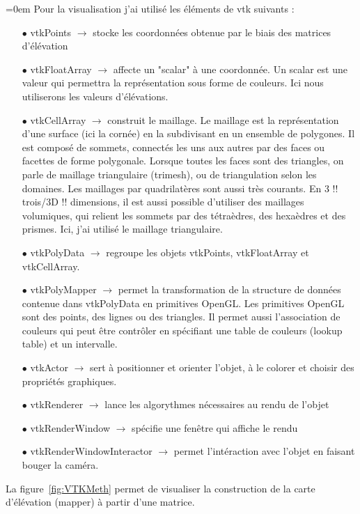 \documentclass[a4paper,12pt]{article}
\begin{document}
\vspace{0.25cm}
\parindent=0em Pour la visualisation j'ai utilisé les éléments de vtk suivants :
\begin{itemize}\setlength{\itemsep}{1mm}
	\item[$\bullet$] vtkPoints	$\rightarrow$ stocke les coordonnées obtenue par le biais des matrices d'élévation 
	\item[$\bullet$] vtkFloatArray $\rightarrow$ affecte un "scalar" à une coordonnée. Un scalar est une valeur qui permettra la représentation sous forme de couleurs. Ici nous utiliserons les valeurs d'élévations.
	\item[$\bullet$] vtkCellArray $\rightarrow$ construit le maillage. Le maillage est la représentation d'une surface (ici la cornée) en la subdivisant en un ensemble de polygones. Il est composé de sommets,  connectés les uns aux autres par des faces ou facettes de forme polygonale. Lorsque toutes les faces sont des triangles, on parle de maillage triangulaire (trimesh), ou de triangulation selon les domaines. Les maillages par quadrilatères sont aussi très courants. En 3 !! trois/3D !! dimensions, il est aussi possible d'utiliser des maillages volumiques, qui relient les sommets par des tétraèdres, des hexaèdres et des prismes. Ici, j'ai utilisé le maillage triangulaire. 
	\item[$\bullet$] vtkPolyData $\rightarrow$ regroupe les objets vtkPoints, vtkFloatArray et vtkCellArray.
	\item[$\bullet$] vtkPolyMapper	$\rightarrow$ permet la transformation de la structure de données contenue dans vtkPolyData en primitives OpenGL. Les primitives OpenGL sont des points, des lignes ou des triangles. Il permet aussi l'association de couleurs qui peut être contrôler en spécifiant une table de couleurs (lookup table) et un intervalle.
	\item[$\bullet$] vtkActor $\rightarrow$ sert à positionner et orienter l'objet, à le colorer et choisir des propriétés graphiques. 
	\item[$\bullet$] vtkRenderer $\rightarrow$ lance les algorythmes nécessaires au rendu de l'objet
	\item[$\bullet$] vtkRenderWindow $\rightarrow$ spécifie une fenêtre qui affiche le rendu
	\item[$\bullet$] vtkRenderWindowInteractor $\rightarrow$ permet l'intéraction avec l'objet en faisant bouger la caméra.
\end{itemize}
 \vspace{0.25cm}
La figure~\ref{fig:VTKMeth} permet de visualiser la construction de la carte d'élévation (mapper) à partir d'une matrice.
\end{document}
